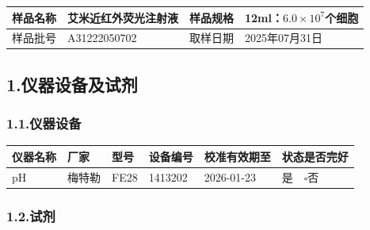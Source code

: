 \documentclass[UTF8,10pt,a4paper,fontset=fandol]{ctexart}
\newcommand{\fieldvalue}[1]{#1}
\newcommand{\handwritten}[1]{#1}
\begin{document}
\begin{tabular}{|p{3cm}|p{5cm}|p{3cm}|p{5cm}|}
\hline
样品名称 &
\fieldvalue{艾米近红外荧光注射液} &
样品规格 &
\fieldvalue{12ml：$6.0\times10^{7}$个细胞}
\\ \hline
样品批号 &
\fieldvalue{\handwritten{A31222050702}} &
取样日期 &
\fieldvalue{\handwritten{2025年07月31日}}
\\ \hline
\end{tabular}

\subsection*{1.\quad 仪器设备及试剂}

\subsubsection*{1.1.\quad 仪器设备}

\begin{tabular}{|p{2.2cm}|p{2.7cm}|p{2.2cm}|p{2.7cm}|p{3cm}|p{2.8cm}|}
\hline
仪器名称 & 厂家 & 型号 & 设备编号 & 校准有效期至 & 状态是否完好
\\ \hline
\fieldvalue{pH} &
\fieldvalue{梅特勒} &
\fieldvalue{FE28} &
\fieldvalue{1413202} &
\fieldvalue{\handwritten{2026-01-23}} &
\fieldvalue{是}\ \ $\square$否
\\ \hline
\end{tabular}

\subsubsection*{1.2.\quad 试剂}
\end{document}
